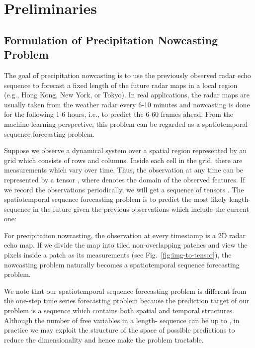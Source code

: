 \documentclass{article} \usepackage{amsmath}
\begin{document}
\section{Preliminaries}
\subsection{Formulation of Precipitation Nowcasting Problem}

The goal of precipitation nowcasting is to use the previously observed radar echo sequence to forecast a fixed length of the future radar maps in a local region (e.g., Hong Kong, New York, or Tokyo). In real applications, the radar maps are usually taken from the weather radar every 6-10 minutes and nowcasting is done for the following 1-6 hours, i.e., to predict the 6-60 frames ahead.  From the machine learning perspective, this problem can be regarded as a spatiotemporal sequence forecasting problem.

Suppose we observe a dynamical system over a spatial region represented by an  grid which consists of  rows and  columns.  Inside each cell in the grid, there are  measurements which vary over time.  Thus, the observation at any time can be represented by a tensor , where  denotes the domain of the observed features. If we record the observations periodically, we will get a sequence of tensors .
The spatiotemporal sequence forecasting problem is to predict the most likely length- sequence in the future given the previous  observations which include the current one:

For precipitation nowcasting, the observation at every timestamp is a 2D radar echo map. If we divide the map into tiled non-overlapping patches and view the pixels inside a patch as its measurements (see Fig.~\ref{fig:img-to-tensor}), the nowcasting problem naturally becomes a spatiotemporal sequence forecasting problem.

We note that our spatiotemporal sequence forecasting problem is different from the one-step time series forecasting problem because the prediction target of our problem is a sequence which contains both spatial and temporal structures. Although the number of free variables in a length- sequence can be up to , in practice we may exploit the structure of the space of possible predictions to reduce the dimensionality and hence make the problem tractable.
\end{document}
